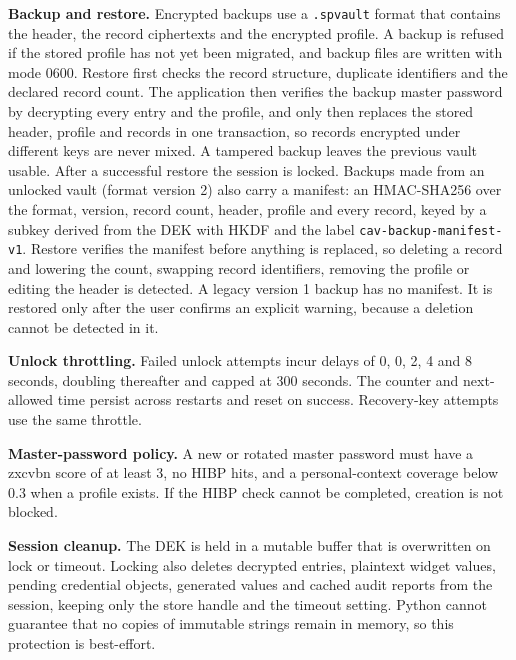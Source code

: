 \documentclass[conference]{IEEEtran}
\begin{document}
\textbf{Backup and restore.} Encrypted backups use a \texttt{.spvault} format that contains the header, the record ciphertexts and the encrypted profile. A backup is refused if the stored profile has not yet been migrated, and backup files are written with mode 0600. Restore first checks the record structure, duplicate identifiers and the declared record count. The application then verifies the backup master password by decrypting every entry and the profile, and only then replaces the stored header, profile and records in one transaction, so records encrypted under different keys are never mixed. A tampered backup leaves the previous vault usable. After a successful restore the session is locked. Backups made from an unlocked vault (format version 2) also carry a manifest: an HMAC-SHA256 over the format, version, record count, header, profile and every record, keyed by a subkey derived from the DEK with HKDF and the label \texttt{cav-backup-manifest-v1}. Restore verifies the manifest before anything is replaced, so deleting a record and lowering the count, swapping record identifiers, removing the profile or editing the header is detected. A legacy version 1 backup has no manifest. It is restored only after the user confirms an explicit warning, because a deletion cannot be detected in it.

\textbf{Unlock throttling.} Failed unlock attempts incur delays of 0, 0, 2, 4 and 8 seconds, doubling thereafter and capped at 300 seconds. The counter and next-allowed time persist across restarts and reset on success. Recovery-key attempts use the same throttle.

\textbf{Master-password policy.} A new or rotated master password must have a zxcvbn score of at least 3, no HIBP hits, and a personal-context coverage below 0.3 when a profile exists. If the HIBP check cannot be completed, creation is not blocked.

\textbf{Session cleanup.} The DEK is held in a mutable buffer that is overwritten on lock or timeout. Locking also deletes decrypted entries, plaintext widget values, pending credential objects, generated values and cached audit reports from the session, keeping only the store handle and the timeout setting. Python cannot guarantee that no copies of immutable strings remain in memory, so this protection is best-effort.
\end{document}
